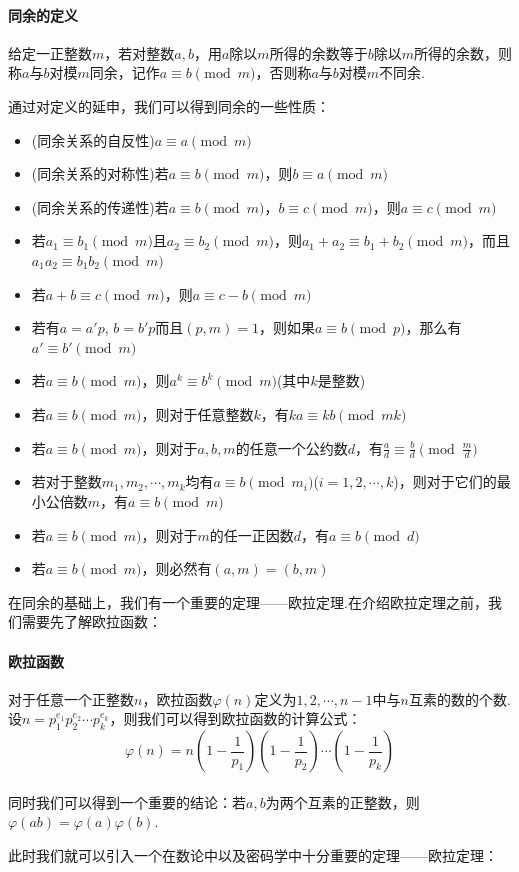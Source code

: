 \documentclass{article}
\numberwithin{equation}{subsubsection}
\begin{document}
\paragraph{\textbf{同余的定义}}
给定一正整数$m$，若对整数$a,b$，用$a$除以$m$所得的余数等于$b$除以$m$所得的余数，则称$a$与$b$对模$m$同余，记作$a\equiv b\pmod{m}$，否则称$a$与$b$对模$m$不同余.\par
通过对定义的延申，我们可以得到同余的一些性质：
\begin{itemize}
    \item (同余关系的自反性)$a\equiv a\pmod{m}$
    \item (同余关系的对称性)若$a\equiv b\pmod{m}$，则$b\equiv a\pmod{m}$
    \item (同余关系的传递性)若$a\equiv b\pmod{m}$，$b\equiv c\pmod{m}$，则$a\equiv c\pmod{m}$
    \item 若$a_1\equiv b_1\pmod{m}$且$a_2\equiv b_2\pmod{m}$，则$a_1+a_2\equiv b_1+b_2\pmod{m}$，而且$a_1a_2\equiv b_1b_2\pmod{m}$
    \item 若$a+b\equiv c\pmod{m}$，则$a\equiv c-b\pmod{m}$
    \item 若有$a=a'p$, $b=b'p$而且$(p,m)=1$，则如果$a\equiv b\pmod{p}$，那么有$a'\equiv b'\pmod{m}$
    \item 若$a\equiv b\pmod{m}$，则$a^k\equiv b^k\pmod{m}$(其中$k$是整数)
    \item 若$a\equiv b\pmod{m}$，则对于任意整数$k$，有$ka\equiv kb\pmod{mk}$
    \item 若$a\equiv b\pmod{m}$，则对于$a,b,m$的任意一个公约数$d$，有$\frac{a}{d}\equiv \frac{b}{d}\pmod{\frac{m}{d}}$
    \item 若对于整数$m_1,m_2,\cdots,m_k$均有$a\equiv b\pmod{m_i}$($i=1,2,\cdots,k$)，则对于它们的最小公倍数$m$，有$a\equiv b\pmod{m}$
    \item 若$a\equiv b\pmod{m}$，则对于$m$的任一正因数$d$，有$a\equiv b\pmod{d}$
    \item 若$a\equiv b\pmod{m}$，则必然有$(a,m)=(b,m)$
\end{itemize}\par
在同余的基础上，我们有一个重要的定理——欧拉定理.在介绍欧拉定理之前，我们需要先了解欧拉函数：
\paragraph{\textbf{欧拉函数}}
对于任意一个正整数$n$，欧拉函数$\varphi(n)$定义为$1,2,\cdots,n-1$中与$n$互素的数的个数.
设$n=p_1^{e_1}p_2^{e_2}\cdots p_k^{e_k}$，则我们可以得到欧拉函数的计算公式：
\begin{equation}
    \varphi(n)=n\left(1-\frac{1}{p_1}\right)\left(1-\frac{1}{p_2}\right)\cdots\left(1-\frac{1}{p_k}\right)
    \nonumber
\end{equation}\\
同时我们可以得到一个重要的结论：若$a,b$为两个互素的正整数，则$\varphi(ab)=\varphi(a)\varphi(b)$.\par
此时我们就可以引入一个在数论中以及密码学中十分重要的定理——欧拉定理：
\end{document}
